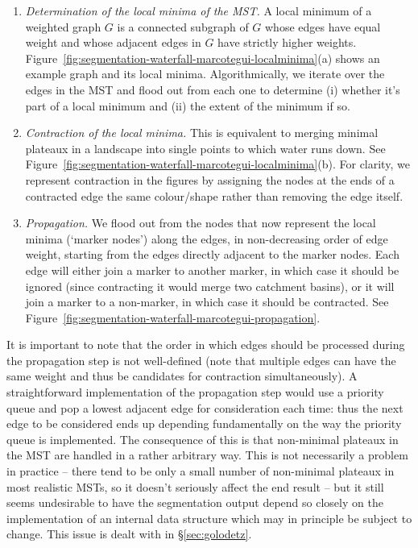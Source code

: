 \documentclass[preprint,a4paper]{elsarticle}
\begin{document}
\begin{enumerate}

\item \emph{Determination of the local minima of the MST.} A local minimum of a weighted graph $G$ is a connected subgraph of $G$ whose edges have equal weight and whose adjacent edges in $G$ have strictly higher weights. Figure~\ref{fig:segmentation-waterfall-marcotegui-localminima}(a) shows an example graph and its local minima. Algorithmically, we iterate over the edges in the MST and flood out from each one to determine (i) whether it's part of a local minimum and (ii) the extent of the minimum if so.

\item \emph{Contraction of the local minima.} This is equivalent to merging minimal plateaux in a landscape into single points to which water runs down. See Figure~\ref{fig:segmentation-waterfall-marcotegui-localminima}(b). For clarity, we represent contraction in the figures by assigning the nodes at the ends of a contracted edge the same colour/shape rather than removing the edge itself.

\item \emph{Propagation.} We flood out from the nodes that now represent the local minima (`marker nodes') along the edges, in non-decreasing order of edge weight, starting from the edges directly adjacent to the marker nodes. Each edge will either join a marker to another marker, in which case it should be ignored (since contracting it would merge two catchment basins), or it will join a marker to a non-marker, in which case it should be contracted. See Figure~\ref{fig:segmentation-waterfall-marcotegui-propagation}.

\end{enumerate}

\noindent It is important to note that the order in which edges should be processed during the propagation step is not well-defined (note that multiple edges can have the same weight and thus be candidates for contraction simultaneously). A straightforward implementation of the propagation step would use a priority queue and pop a lowest adjacent edge for consideration each time: thus the next edge to be considered ends up depending fundamentally on the way the priority queue is implemented. The consequence of this is that non-minimal plateaux in the MST are handled in a rather arbitrary way. This is not necessarily a problem in practice -- there tend to be only a small number of non-minimal plateaux in most realistic MSTs, so it doesn't seriously affect the end result -- but it still seems undesirable to have the segmentation output depend so closely on the implementation of an internal data structure which may in principle be subject to change. This issue is dealt with in \S\ref{sec:golodetz}.
\end{document}
